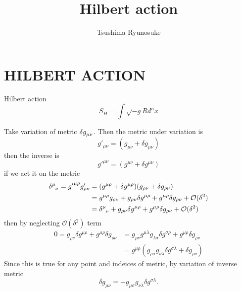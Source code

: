 \documentclass{article}
\title{Hilbert action}
\author{Tsushima Ryunosuke}
\date{}
\theoremstyle{definition}
\def\t{\tensor}
\begin{document}
\maketitle

\section{HILBERT ACTION}
Hilbert action 
\begin{equation}
    S_H = \int \sqrt{-g} R d^nx
\end{equation}

Take variation of metric $\delta \t{g}{_\mu_\nu}$. Then the metric under variation is 
\begin{equation}
    g'_{\mu\nu} = (g_{\mu\nu} + \delta g_{\mu\nu}) 
\end{equation}
then the inverse is
\begin{equation}
    {g'}^{\mu\nu} = (g^{\mu\nu} +  \delta g^{\mu\nu})
\end{equation}
if we act it on the metric
\begin{align}
    \t{\delta}{^\mu_\nu} = {g'}^{\mu\rho} g'_{\rho \nu} &= (g^{\mu\rho} +\delta g^{\mu\rho})(g_{\rho\nu} + \delta g_{\rho\nu}) \\
                                                        &= g^{\mu\rho} g_{\rho\nu} + g_{\rho\nu} \delta g^{\mu\rho} + g^{\mu\rho} \delta g_{\rho\nu} + \mathcal{O} (\delta^2) \\
                                                        &= \t{\delta}{^\mu_\nu} + g_{\rho\nu} \delta g^{\mu\rho} + g^{\mu\rho} \delta g_{\rho\nu} + \mathcal{O} (\delta^2)
\end{align}
then by neglecting $\mathcal{O}(\delta^2)$ term
\begin{align}
    0 = g_{\rho\nu} \delta g^{\mu\rho} + g^{\mu\rho} \delta g_{\rho\nu}  &= g_{\rho\nu} g^{\mu \lambda} g_{\lambda\sigma}  \delta g^{\sigma\rho} + g^{\mu\rho} \delta g_{\rho\nu} \\
                                                                         &= g^{\mu \rho} \left(  g_{\rho \sigma} g_{\nu\lambda}\delta g^{\sigma \lambda} +\delta g_{\rho\nu}\right)
\end{align}
Since this is true for any point and indeices of metric, by variation of inverse metric
\begin{equation}
    \delta g_{\mu \nu} = - g_{\mu \sigma} g_{\nu\lambda}\delta g^{\sigma \lambda}.
\end{equation}
 
\end{document}
